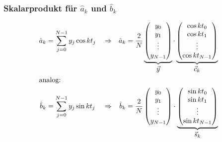 %
%
\begin{frame}
\frametitle{Skalarprodukt für $\hat a_k$ und $\hat b_k$}
\begin{align*}
\hat a_k
&=
\sum_{j=0}^{N-1} y_j \cos kt_j
&&\Rightarrow&
\hat a_k
&=
\frac{2}{N}
\underbrace{
\begin{pmatrix}y_0\\y_1\\\vdots\\y_{N-1}\end{pmatrix}
}_{\displaystyle\vec{y}}
\cdot
\underbrace{
\begin{pmatrix}\cos kt_0\\\cos kt_1\\\vdots\\\cos kt_{N-1}\end{pmatrix}
}_{\displaystyle \vec{c}_k}
\\
\intertext{analog:}
\hat b_k
&=
\sum_{j=0}^{N-1} y_j \sin kt_j
&&\Rightarrow&
\hat b_k
&=
\frac{2}{N}
\begin{pmatrix}y_0\\y_1\\\vdots\\y_{N-1}\end{pmatrix}
\cdot
\underbrace{
\begin{pmatrix}\sin kt_0\\\sin kt_1\\\vdots\\\sin kt_{N-1}\end{pmatrix}
}_{\displaystyle \vec{s}_k}
\\
\end{align*}
\end{frame}


